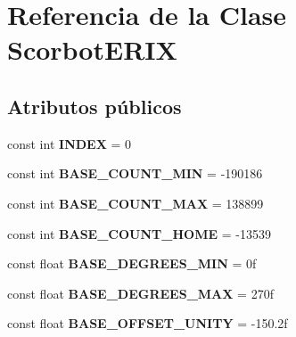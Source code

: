 \hypertarget{class_scorbot_e_r_i_x}{}\section{Referencia de la Clase Scorbot\+E\+R\+IX}
\label{class_scorbot_e_r_i_x}
\subsection*{Atributos públicos}
\begin{DoxyCompactItemize}
\item 
\mbox{\label{class_scorbot_e_r_i_x_a024acbeb40094f4a86305f41a3f3a316}} 
const int {\bfseries I\+N\+D\+EX} = 0
\item 
\mbox{\label{class_scorbot_e_r_i_x_ad70b7474a6c1bb4df5246137fccdc4c1}} 
const int {\bfseries B\+A\+S\+E\+\_\+\+C\+O\+U\+N\+T\+\_\+\+M\+IN} = -\/190186
\item 
\mbox{\label{class_scorbot_e_r_i_x_a685f6fae85f78b27420c93973e40541b}} 
const int {\bfseries B\+A\+S\+E\+\_\+\+C\+O\+U\+N\+T\+\_\+\+M\+AX} = 138899
\item 
\mbox{\label{class_scorbot_e_r_i_x_acb0fc5930e94106bb9c93aad8e440740}} 
const int {\bfseries B\+A\+S\+E\+\_\+\+C\+O\+U\+N\+T\+\_\+\+H\+O\+ME} = -\/13539
\item 
\mbox{\label{class_scorbot_e_r_i_x_ab76a4a8f8a1d26ba046506f378b27ca3}} 
const float {\bfseries B\+A\+S\+E\+\_\+\+D\+E\+G\+R\+E\+E\+S\+\_\+\+M\+IN} = 0f
\item 
\mbox{\label{class_scorbot_e_r_i_x_a4e98c50b8b327d0e25e0cf9be2c840c3}} 
const float {\bfseries B\+A\+S\+E\+\_\+\+D\+E\+G\+R\+E\+E\+S\+\_\+\+M\+AX} = 270f
\item 
\mbox{\label{class_scorbot_e_r_i_x_a48963e027682674379d3b19be69e7ca2}} 
const float {\bfseries B\+A\+S\+E\+\_\+\+O\+F\+F\+S\+E\+T\+\_\+\+U\+N\+I\+TY} = -\/150.\+2f
\item 
\mbox{\label{class_scorbot_e_r_i_x_aa6824486370ab3b60f3229ccb205bf05}} 

\end{DoxyCompactItemize}
